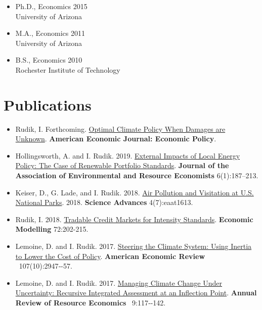 \documentclass{res} %
\begin{document}
\begin{resume}

	\begin{itemize}
		\item[] Ph.D., Economics \hfill 2015\\
		University of Arizona

		\item[] M.A., Economics \hfill 2011\\
		University of Arizona

		\item[] B.S.,  Economics \hfill 2010\\
		Rochester Institute of Technology

	\end{itemize}
\vspace{-.075in}
\section{Publications}
\begin{itemize}
	\item[] Rudik, I. Forthcoming. \href{https://www.aeaweb.org/articles?id=10.1257/pol.20160541}{Optimal Climate Policy When Damages are Unknown}. \textbf{American Economic Journal: Economic Policy}.
	\item[] Hollingsworth, A. and I. Rudik. 2019. \href{http://papers.ssrn.com/sol3/papers.cfm?abstract_id=2697222}{External Impacts of Local Energy Policy: The Case of Renewable Portfolio Standards}. \textbf{Journal of the Association of Environmental and Resource Economists} 6(1):187--213.
	\item[] Keiser, D., G. Lade, and I. Rudik. 2018. \href{http://advances.sciencemag.org/content/4/7/eaat1613}{Air Pollution and Visitation at U.S. National Parks}. 2018. \textbf{Science Advances} 4(7):eaat1613.
	\item[] Rudik, I. 2018. \href{https://www.sciencedirect.com/science/article/pii/S0264999317315651}{Tradable Credit Markets for Intensity Standards}. \textbf{Economic Modelling} 72:202-215.
	\item[] Lemoine, D. and I. Rudik. 2017.  \href{http://papers.ssrn.com/sol3/papers.cfm?abstract_id=2443594}{Steering the Climate System: Using Inertia to Lower the Cost of Policy}. \textbf{American Economic Review}  107(10):2947‐-57.
	\item[] Lemoine, D. and I. Rudik. 2017. \href{https://papers.ssrn.com/sol3/papers.cfm?abstract_id=2862211}{Managing Climate Change Under Uncertainty: Recursive Integrated Assessment at an Inflection Point}.  \textbf{Annual Review of Resource Economics}  9:117‐-142.

\end{itemize}
\end{resume}
\end{document}
